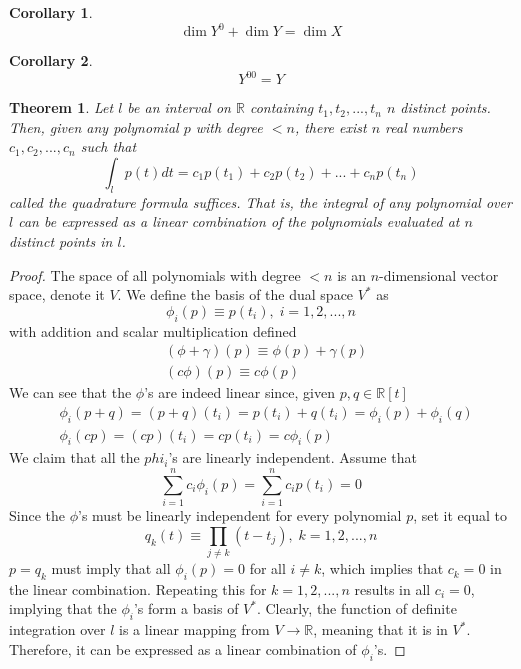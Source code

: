 \documentclass{article}
\newtheorem{theorem}{Theorem}[section]
\newtheorem{corollary}{Corollary}[theorem]
\theoremstyle{remark}
\theoremstyle{definition}
\begin{document}
    \begin{corollary}
    \[\dim Y^0 + \dim Y = \dim X\]
    \end{corollary}

    \begin{corollary}
    \[Y^{0 0} = Y\]
    \end{corollary}

    \begin{theorem}
    Let $l$ be an interval on $\mathbb{R}$ containing $t_1, t_2, ..., t_n$ $n$ distinct points. Then, given any polynomial $p$ with degree $< n$, there exist $n$ real numbers $c_1, c_2, ..., c_n$ such that
    \[ \int_l p(t) d t = c_1 p(t_1) + c_2 p(t_2) + ... + c_n p(t_n)\]
    called the \textit{quadrature formula} suffices. That is, the integral of any polynomial over $l$ can be expressed as a linear combination of the polynomials evaluated at $n$ distinct points in $l$. 
    \end{theorem}

    \begin{proof}
    The space of all polynomials with degree $< n$ is an $n$-dimensional vector space, denote it $V$. We define the basis of the dual space $V^*$ as 
    \[\phi_i (p) \equiv p(t_i), \; i = 1, 2, ..., n\]
    with addition and scalar multiplication defined
    \begin{align*}
        & (\phi + \gamma) (p) \equiv \phi(p) + \gamma(p) \\
        & (c \phi) (p) \equiv c \phi (p) 
    \end{align*}
    We can see that the $\phi$'s are indeed linear since, given $p, q \in \mathbb{R}[t]$
    \begin{align*}
        & \phi_i (p + q) = (p + q) (t_i) = p(t_i) + q(t_i) = \phi_i (p) + \phi_i (q) \\
        & \phi_i (c p) = (c p) (t_i) = c p(t_i) = c \phi_i (p)
    \end{align*}
    We claim that all the $phi_i$'s are linearly independent. Assume that \[\sum_{i=1}^n c_i \phi_i (p) = \sum_{i=1}^n c_i p(t_i) = 0\]
    Since the $\phi$'s must be linearly independent for every polynomial $p$, set it equal to
    \[q_k (t) \equiv \prod_{j \neq k} (t - t_j), \; k = 1, 2, ..., n\]
    $p = q_k$ must imply that all $\phi_i (p) = 0$ for all $i \neq k$, which implies that $c_k = 0$ in the linear combination. Repeating this for $k = 1, 2, ..., n$ results in all $c_i = 0$, implying that the $\phi_i$'s form a basis of $V^*$. Clearly, the function of definite integration over $l$ is a linear mapping from $V \longrightarrow \mathbb{R}$, meaning that it is in $V^*$. Therefore, it can be expressed as a linear combination of $\phi_i$'s. 
    \end{proof}
\end{document}
